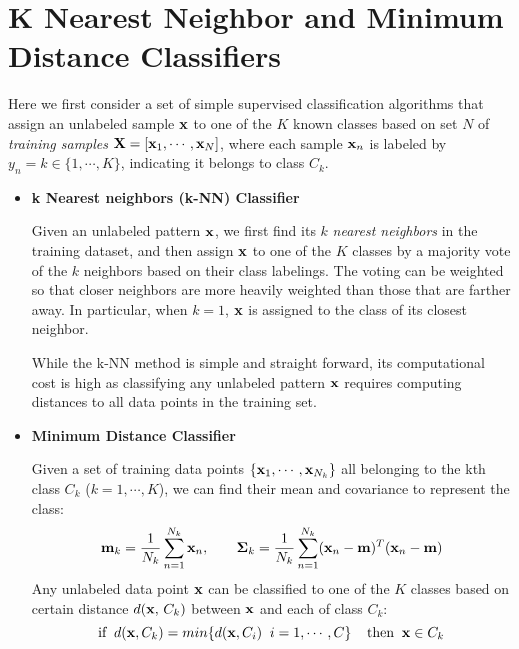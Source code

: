 \documentclass{article}
\begin{document}
\section{K Nearest Neighbor and Minimum Distance Classifiers}

Here we first consider a set of simple supervised classification
algorithms that assign an unlabeled sample ${\bf x}$ to one of 
the $K$ known classes based on set $N$ of {\em training samples} 
${\bf X}=[{\bf x}_1,\cdots,{\bf x}_N]$, where each sample ${\bf x}_n$ 
is labeled by $y_n=k\in\{1,\cdots,K\}$, indicating it belongs to 
class $C_k$. 

\begin{itemize}

\item {\bf k Nearest neighbors (k-NN) Classifier}

  Given an unlabeled pattern ${\bf x}$, we first find its $k$
  {\em nearest neighbors} in the training dataset, and then assign 
  ${\bf x}$ to one of the $K$ classes by a majority vote of the $k$
  neighbors based on their class labelings. The voting can be weighted
  so that closer neighbors are more heavily weighted than those that 
  are farther away. In particular, when $k=1$, ${\bf x}$ is assigned 
  to the class of its closest neighbor.

  While the k-NN method is simple and straight forward, its computational
  cost is high as classifying any unlabeled pattern ${\bf x}$ requires 
  computing distances to all data points in the training set.

\item {\bf Minimum Distance Classifier}

  Given a set of training data points $\{{\bf x}_1,\cdots,{\bf x}_{N_k}\}$ 
  all belonging to the kth class $C_k$ ($k=1,\cdots,K$), we can find their 
  mean and covariance to represent the class:
  \begin{equation}
    {\bf m}_k=\frac{1}{N_k}\sum_{n=1}^{N_k} {\bf x}_n,\;\;\;\;\;\;\;
    {\bf\Sigma}_k=\frac{1}{N_k}\sum_{n=1}^{N_k} ({\bf x}_n-{\bf m})^T
    ({\bf x}_n-{\bf m})
  \end{equation}
  Any unlabeled data point ${\bf x}$ can be classified to one of the
  $K$ classes based on certain distance $d({\bf x},\,C_k)$ between
  ${\bf x}$ and each of class $C_k$:
  \begin{equation}
    \mbox{if}\;\;d({\bf x},C_k)=min \{d({\bf x},C_i)\;\;i=1,\cdots,C \} 
    \;\;\;\;\mbox{then} \;\;{\bf x}\in C_k
  \end{equation}
  

\end{itemize}
\end{document}
